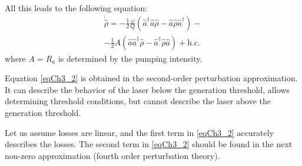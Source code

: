 All this leads to the following equation:
\begin{eqnarray}
\dot{\hat{\rho}} =
- \frac{1}{2}\frac{\omega}{Q}
\left(\hat{a}^{\dag}\hat{a}\hat{\rho} - 
\hat{a}\hat{\rho}\hat{a}^{\dag}
\right)
-
\nonumber \\
- \frac{1}{2}A
\left(\hat{a}\hat{a}^{\dag}\hat{\rho} - 
\hat{a}^{\dag}\hat{\rho}\hat{a}
\right)
 + \mbox{h.c.}
\label{eqCh3_2}
\end{eqnarray}
where $A = R_a$ is determined by the pumping intensity.

Equation \eqref{eqCh3_2} is obtained in the second-order perturbation approximation.
It can describe the behavior of the laser below
the generation threshold, allows determining threshold conditions, but cannot
describe the laser above the generation threshold.

Let us assume losses are linear, and the first term in \eqref{eqCh3_2}
accurately describes the losses. The second term in \eqref{eqCh3_2} should be
found in the next non-zero approximation (fourth order perturbation theory).

